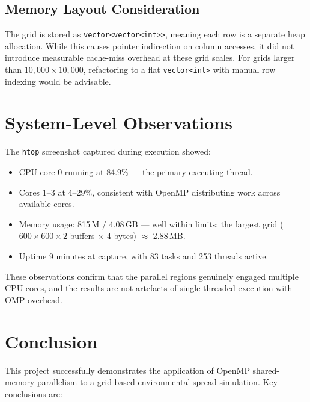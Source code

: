 \documentclass[12pt,a4paper]{article}
\begin{document}
\subsection{Memory Layout Consideration}

The grid is stored as \texttt{vector<vector<int>>}, meaning each row is a separate
heap allocation. While this causes pointer indirection on column accesses, it did not
introduce measurable cache-miss overhead at these grid scales. For grids larger than
$10{,}000 \times 10{,}000$, refactoring to a flat \texttt{vector<int>} with manual
row indexing would be advisable.

\section{System-Level Observations}

The \texttt{htop} screenshot captured during execution showed:

\begin{itemize}
    \item CPU core 0 running at 84.9\% --- the primary executing thread.
    \item Cores 1--3 at 4--29\%, consistent with OpenMP distributing work across
          available cores.
    \item Memory usage: 815\,M / 4.08\,GB --- well within limits; the largest grid
          ($600\times600 \times 2$ buffers $\times$ 4 bytes) $\approx$ 2.88\,MB.
    \item Uptime 9 minutes at capture, with 83 tasks and 253 threads active.
\end{itemize}

These observations confirm that the parallel regions genuinely engaged multiple CPU
cores, and the results are not artefacts of single-threaded execution with OMP
overhead.

\section{Conclusion}

This project successfully demonstrates the application of OpenMP shared-memory
parallelism to a grid-based environmental spread simulation. Key conclusions are:
\end{document}
